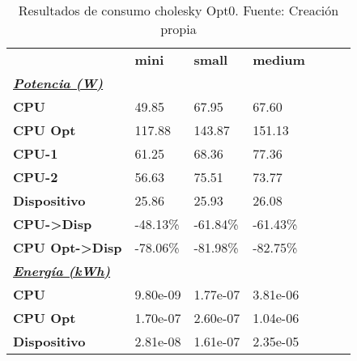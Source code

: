 \begin{table}[H]
    \centering
    \begin{tabular}{lllllll}
    \rowcolor[HTML]{DAE8FC} \ & \textbf{mini} & \textbf{	small} & \textbf{	medium} \\
    \cellcolor[HTML]{DAE8FC} \textbf{\textbf{{\emph{{\underline{{Potencia (W)}}}}}}} &  & 	 & 	 \\
    \rowcolor[HTML]{EFEFEF} \cellcolor[HTML]{DAE8FC} \textbf{CPU} & 49.85 & 	67.95 & 	67.60 \\
    \cellcolor[HTML]{DAE8FC} \textbf{CPU Opt} & 117.88 & 	143.87 & 	151.13 \\
    \rowcolor[HTML]{EFEFEF} \cellcolor[HTML]{DAE8FC} \textbf{\quad CPU-1} & 61.25 & 	68.36 & 	77.36 \\
    \cellcolor[HTML]{DAE8FC} \textbf{\quad CPU-2} & 56.63 & 	75.51 & 	73.77 \\
    \rowcolor[HTML]{EFEFEF} \cellcolor[HTML]{DAE8FC} \textbf{Dispositivo} & 25.86 & 	25.93 & 	26.08 \\
    \cellcolor[HTML]{DAE8FC} \textbf{CPU->Disp} & -48.13\% & 	-61.84\% & 	-61.43\% \\
    \rowcolor[HTML]{EFEFEF} \cellcolor[HTML]{DAE8FC} \textbf{CPU Opt->Disp} & -78.06\% & 	-81.98\% & 	-82.75\% \\
    \cellcolor[HTML]{DAE8FC} \textbf{\textbf{{\emph{{\underline{{Energía (kWh)}}}}}}} &  & 	 & 	 \\
    \rowcolor[HTML]{EFEFEF} \cellcolor[HTML]{DAE8FC} \textbf{CPU} & 9.80e-09 & 	1.77e-07 & 	3.81e-06 \\
    \cellcolor[HTML]{DAE8FC} \textbf{CPU Opt} & 1.70e-07 & 	2.60e-07 & 	1.04e-06 \\
    \rowcolor[HTML]{EFEFEF} \cellcolor[HTML]{DAE8FC} \textbf{Dispositivo} & 2.81e-08 & 	1.61e-07 & 	2.35e-05 \\
    \end{tabular}
    \caption[Resultados de consumo cholesky Opt0]{{Resultados de consumo cholesky Opt0. Fuente: Creación propia}}
    \label{table_test_cholesky_Opt0_hw_powerResults}
\end{table}